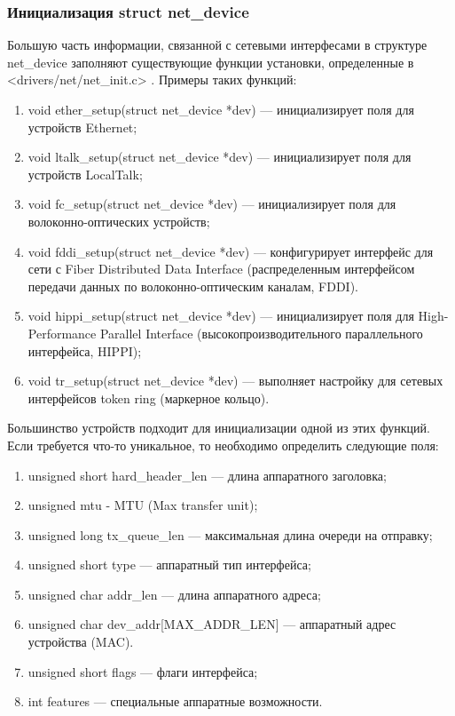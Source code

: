 \documentclass[14pt, a4paper]{extarticle}
\begin{document}
\subsubsection{Инициализация struct net\_device}
Большую часть информации, связанной с сетевыми интерфесами в структуре net\_device заполняют существующие функции установки, определенные в <drivers/net/net\_init.c> \cite{ldd-orig}. Примеры таких функций:
\begin{enumerate}
	\item void ether\_setup(struct net\_device *dev) --- инициализирует поля для устройств Ethernet;
	\item void ltalk\_setup(struct net\_device *dev) --- инициализирует поля для устройств LocalTalk;
	\item void fc\_setup(struct net\_device *dev) --- инициализирует поля для волоконно-оптических устройств;
	\item void fddi\_setup(struct net\_device *dev) --- конфигурирует интерфейс для сети с Fiber Distributed Data Interface (распределенным интерфейсом передачи данных по волоконно-оптическим каналам, FDDI).
	\item void hippi\_setup(struct net\_device *dev) --- инициализирует поля для High-Performance Parallel Interface (высокопроизводительного параллельного интерфейса, HIPPI);
	\item void tr\_setup(struct net\_device *dev) --- выполняет настройку для сетевых интерфейсов token ring (маркерное кольцо).
\end{enumerate}
\indent Большинство устройств подходит для инициализации одной из этих функций. Если требуется что-то уникальное, то необходимо определить следующие поля:
\begin{enumerate}
	\item unsigned short hard\_header\_len --- длина аппаратного заголовка;
	\item unsigned mtu - MTU (Max transfer unit);
	\item unsigned long tx\_queue\_len --- максимальная длина очереди на отправку;
	\item unsigned short type --- аппаратный тип интерфейса;
	\item unsigned char addr\_len --- длина аппаратного адреса;
	\item unsigned char dev\_addr[MAX\_ADDR\_LEN] --- аппаратный адрес устройства (MAC).
	\item unsigned short flags --- флаги интерфейса;
	\item int features --- специальные аппаратные возможности.
\end{enumerate}
\end{document}
